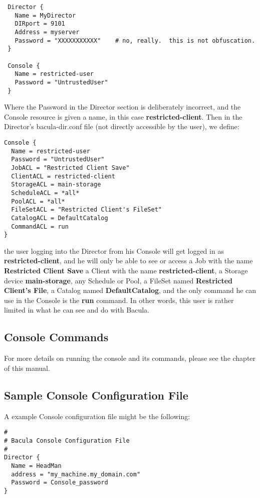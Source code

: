 \footnotesize
\begin{verbatim}
 Director {
   Name = MyDirector
   DIRport = 9101
   Address = myserver
   Password = "XXXXXXXXXXX"    # no, really.  this is not obfuscation.
 }
 
 Console {
   Name = restricted-user
   Password = "UntrustedUser"
 }
\end{verbatim}
\normalsize

Where the Password in the Director section is deliberately incorrect, and the
Console resource is given a name, in this case {\bf restricted-client}. Then
in the Director's bacula-dir.conf file (not directly accessible by the user),
we define: 

\footnotesize
\begin{verbatim}
Console {
  Name = restricted-user
  Password = "UntrustedUser"
  JobACL = "Restricted Client Save"
  ClientACL = restricted-client
  StorageACL = main-storage
  ScheduleACL = *all*
  PoolACL = *all*
  FileSetACL = "Restricted Client's FileSet"
  CatalogACL = DefaultCatalog
  CommandACL = run
}
\end{verbatim}
\normalsize

the user logging into the Director from his Console will get logged in as {\bf
restricted-client}, and he will only be able to see or access a Job with the
name {\bf Restricted Client Save} a Client with the name {\bf
restricted-client}, a Storage device {\bf main-storage}, any Schedule or Pool,
a FileSet named {\bf Restricted Client's File}, a Catalog named {\bf
DefaultCatalog}, and the only command he can use in the Console is the {\bf
run} command. In other words, this user is rather limited in what he can see
and do with Bacula. 

\subsection*{Console Commands}

For more details on running the console and its commands, please see the 
 chapter of this manual. 

\subsection*{Sample Console Configuration File}
\label{SampleConfiguration2}

A example Console configuration file might be the following: 

\footnotesize
\begin{verbatim}
#
# Bacula Console Configuration File
#
Director {
  Name = HeadMan
  address = "my_machine.my_domain.com"
  Password = Console_password
}
\end{verbatim}
\normalsize
